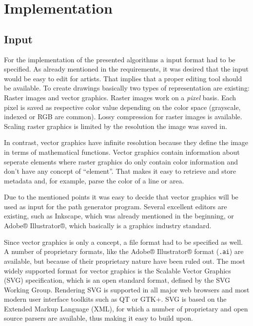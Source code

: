 \chapter{Implementation}
\section{Input}	%
For the implementation of the presented algorithms a input format had to be specified. As already mentioned in the requirements, it was desired that the input would be easy to edit for artists. That implies that a proper editing tool should be available. To create drawings basically two types of representation are existing: Raster images and vector graphics. Raster images work on a \textit{pixel} basis. Each pixel is saved as respective color value depending on the color space (grayscale, indexed or RGB are common). Lossy compression for raster images is available. Scaling raster graphics is limited by the resolution the image was saved in.

In contrast, vector graphics have infinite resolution because they define the image in terms of mathematical functions. Vector graphics contain information about seperate elements where raster graphics do only contain color information and don't have any concept of \enquote{element}. That makes it easy to retrieve and store metadata and, for example, parse the color of a line or area.

Due to the mentioned points it was easy to decide that vector graphics will be used as input for the path generator program. Several excellent editors are existing, such as Inkscape, which was already mentioned in the beginning, or Adobe® Illustrator®, which basically is a graphics industry standard.

Since vector graphics is only a concept, a file format had to be specified as well. A number of proprietary formats, like the Adobe® Illustrator® format (\texttt{.ai}) are available, but because of their proprietary nature have been ruled out. The most widely supported format for vector graphics is the Scalable Vector Graphics (SVG) specification, which is an open standard format, defined by the SVG Working Group\cite{svgstandard}. Rendering SVG is supported in all major web browsers and most modern user interface toolkits such as QT or GTK+. SVG is based on the Extended Markup Language (XML), for which a number of proprietary and open source parsers are available, thus making it easy to build upon.

